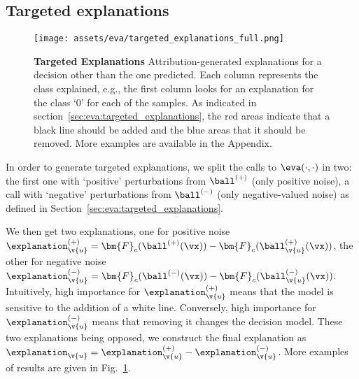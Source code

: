 \subsection{Targeted explanations}
\label{ap:eva:targeted}

\begin{figure}[t!]
  \centering
  \texttt{[image: assets/eva/targeted\_explanations\_full.png]}
  \caption{\textbf{Targeted Explanations} Attribution-generated explanations for a decision other than the one predicted. Each column represents the class explained, e.g., the first column looks for an explanation for the class `0' for each of the samples. As indicated in section~\ref{sec:eva:targeted_explanations}, the red areas indicate that a black line should be added and the blue areas that it should be removed. More examples are available in the Appendix.
  }
  \label{fig:eva:ap_targeted}
\end{figure}

In order to generate targeted explanations, we split the calls to $\eva(\cdot, \cdot)$ in two: the first one with `positive' perturbations from $\ball^{(+)}$ (only positive noise), a call with `negative' perturbations from $\ball^{(-)}$ (only negative-valued noise) as defined in Section~\ref{sec:eva:targeted_explanations}. 

We then get two explanations, one for positive noise
$\explanation^{(+)}_{\v{u}} = \bm{F}_c(\ball^{(+)}(\vx)) - \bm{F}_c(\ball^{(+)}_{\v{u}}(\vx))$, the other for negative noise $\explanation^{(-)}_{\v{u}} = \bm{F}_c(\ball^{(-)}(\vx)) - \bm{F}_c(\ball^{(-)}_{\v{u}}(\vx))$. Intuitively, high importance for $\explanation^{(+)}_{\v{u}}$  means that the model is sensitive to the addition of a white line. Conversely, high importance for $\explanation^{(-)}_{\v{u}}$  means that removing it changes the decision model. These two explanations being opposed, we construct the final explanation as $\explanation_{\v{u}} = \explanation^{(+)}_{\v{u}} - \explanation^{(-)}_{\v{u}}$. More examples of results are given in Fig.~\ref{fig:eva:ap_targeted}.
